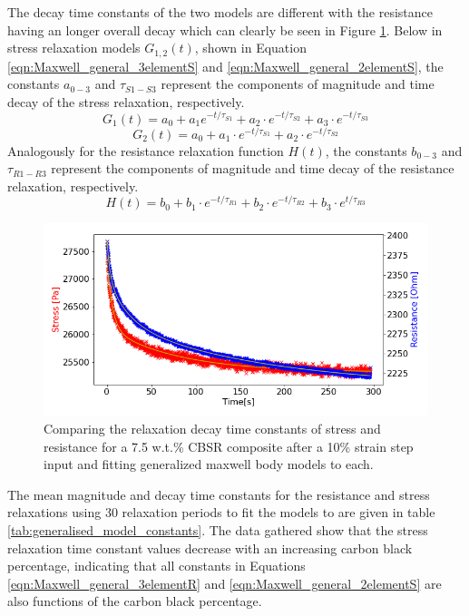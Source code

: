 The decay time constants of the two models are different with the resistance having an longer overall decay which can clearly be seen in Figure \ref{fig:diff_tau_res_stress}. Below in stress relaxation models $G_{1,2}(t)$, shown in Equation \ref{eqn:Maxwell_general_3elementS} and \ref{eqn:Maxwell_general_2elementS}, the constants $a_{0-3}$ and $\tau_{S1-S3}$ represent the components of magnitude and time decay of the stress relaxation, respectively.
\begin{equation}
	G_1(t) = a_0 + a_1e^{-t/\tau_{S1}} + a_2 \cdot e^{-t/\tau_{S2}} + a_3 \cdot e^{-t/\tau_{S3}}
	\label{eqn:Maxwell_general_3elementS} 
\end{equation}
\begin{equation}
	G_2(t) = a_0 + a_1 \cdot e^{-t/\tau_{S1}} + a_2 \cdot e^{-t/\tau_{S2}}
	\label{eqn:Maxwell_general_2elementS} 
\end{equation}
Analogously for the resistance relaxation function $H(t)$, the constants $b_{0-3}$ and $\tau_{R1-R3}$ represent the components of magnitude and time decay of the resistance relaxation, respectively. 
\begin{equation}
	H(t) = b_0 + b_1 \cdot e^{-t/\tau_{R1}} + b_2 \cdot e^{-t/\tau_{R2}} + b_3 \cdot e^{t/\tau_{R3}}
	\label{eqn:Maxwell_general_3elementR} 
\end{equation}
\begin{figure}[H]
	\centering
	\includegraphics[width=0.8\linewidth]{Figures/diff_time_const_Res_Stress_2_7-5_Epin_20mm_v3_pulse_6.png}
	\caption{Comparing the relaxation decay time constants of stress and resistance for a 7.5 w.t.\% CBSR composite after a 10\% strain step input and fitting generalized maxwell body models to each.}
	\label{fig:diff_tau_res_stress}
\end{figure}
The mean magnitude and decay time constants for the resistance and stress relaxations using 30 relaxation periods to fit the models to are given in table \ref{tab:generalised_model_constants}. The data gathered show that the stress relaxation time constant values decrease with an increasing carbon black percentage, indicating that all constants in Equations \ref{eqn:Maxwell_general_3elementR} and \ref{eqn:Maxwell_general_2elementS} are also functions of the carbon black percentage.

